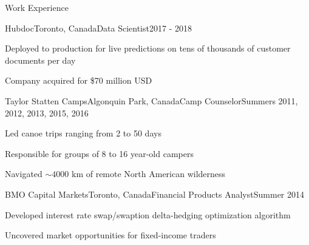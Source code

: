 \documentclass{resume} %
\begin{document}
\begin{rSection}{Work Experience}
\begin{rSubsection}{Hubdoc}{Toronto, Canada}{Data Scientist}{2017 - 2018}
	\item Deployed to production for live predictions on tens of thousands of customer documents per day
	\item Company acquired for \$70 million USD
\end{rSubsection}
\begin{rSubsection}{Taylor Statten Camps}{Algonquin Park, Canada}{Camp Counselor}{Summers 2011, 2012, 2013, 2015, 2016}
	\item Led canoe trips ranging from 2 to 50 days
	\item Responsible for groups of 8 to 16 year-old campers
	\item Navigated ${\sim}4000$ km of remote North American wilderness
\end{rSubsection}
\begin{rSubsection}{BMO Capital Markets}{Toronto, Canada}{Financial Products Analyst}{Summer 2014}
	\item Developed interest rate swap/swaption delta-hedging optimization algorithm
	\item Uncovered market opportunities for fixed-income traders
\end{rSubsection}

\end{rSection}

\end{document}
